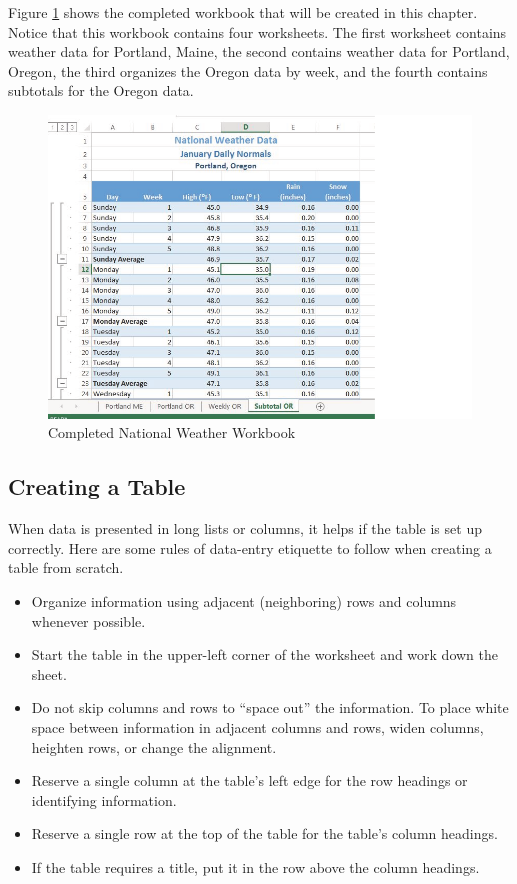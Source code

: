 Figure \ref{05:fig01} shows the completed workbook that will be created in this chapter. Notice that this workbook contains four worksheets. The first worksheet contains weather data for Portland, Maine, the second contains weather data for Portland, Oregon, the third organizes the Oregon data by week, and the fourth contains subtotals for the Oregon data.

\begin{figure}[H]
	\centering
	\includegraphics[width=\maxwidth{.95\linewidth}]{gfx/ch05_fig01}
	\caption{Completed National Weather Workbook}
	\label{05:fig01}
\end{figure}

\subsection{Creating a Table}

When data is presented in long lists or columns, it helps if the table is set up correctly. Here are some rules of data-entry etiquette to follow when creating a table from scratch.

\begin{itemize}
	\item Organize information using adjacent (neighboring) rows and columns whenever possible.
	\item Start the table in the upper-left corner of the worksheet and work down the sheet.
	\item Do not skip columns and rows to ``space out'' the information. To place white space between information in adjacent columns and rows, widen columns, heighten rows, or change the alignment.
	\item Reserve a single column at the table's left edge for the row headings or identifying information.
	\item Reserve a single row at the top of the table for the table's column headings.
	\item If the table requires a title, put it in the row above the column headings.
\end{itemize}

